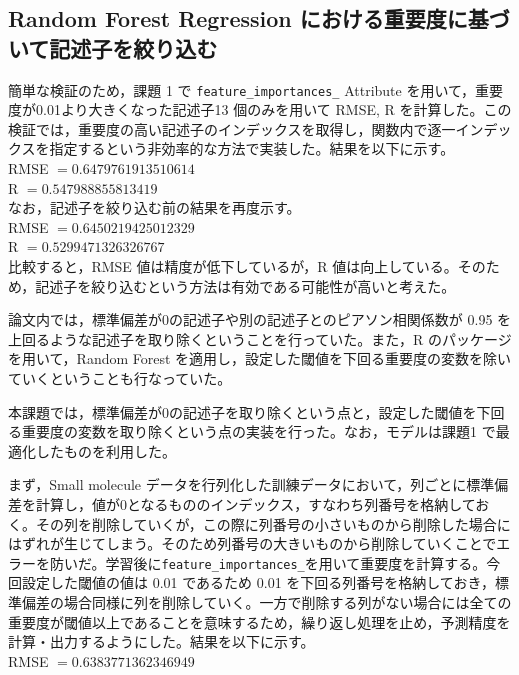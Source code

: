\documentclass[a4j,11pt]{jarticle}
\begin{document}
\subsection{ Random Forest Regression における重要度に基づいて記述子を絞り込む}
簡単な検証のため，課題 1 で \texttt{feature\_importances\_} Attribute を用いて，重要度が0.01より大きくなった記述子13 個のみを用いて RMSE, R を計算した。この検証では，重要度の高い記述子のインデックスを取得し，関数内で逐一インデックスを指定するという非効率的な方法で実装した。結果を以下に示す。\\
\linebreak
RMSE $= 0.6479761913510614$\\
R $= 0.547988855813419$ \\
\linebreak
なお，記述子を絞り込む前の結果を再度示す。\\
\linebreak
RMSE $= 0.6450219425012329$\\
R $= 0.5299471326326767$ \\
\linebreak
比較すると，RMSE 値は精度が低下しているが，R 値は向上している。そのため，記述子を絞り込むという方法は有効である可能性が高いと考えた。\par
論文内では，標準偏差が0の記述子や別の記述子とのピアソン相関係数が 0.95 を上回るような記述子を取り除くということを行っていた。また，R のパッケージを用いて，Random Forest を適用し，設定した閾値を下回る重要度の変数を除いていくということも行なっていた。\par
本課題では，標準偏差が0の記述子を取り除くという点と，設定した閾値を下回る重要度の変数を取り除くという点の実装を行った。なお，モデルは課題1 で最適化したものを利用した。\par
まず，Small molecule データを行列化した訓練データにおいて，列ごとに標準偏差を計算し，値が0となるもののインデックス，すなわち列番号を格納しておく。その列を削除していくが，この際に列番号の小さいものから削除した場合にはずれが生じてしまう。そのため列番号の大きいものから削除していくことでエラーを防いだ。学習後に\texttt{feature\_importances\_}を用いて重要度を計算する。今回設定した閾値の値は 0.01 であるため 0.01 を下回る列番号を格納しておき，標準偏差の場合同様に列を削除していく。一方で削除する列がない場合には全ての重要度が閾値以上であることを意味するため，繰り返し処理を止め，予測精度を計算・出力するようにした。結果を以下に示す。\\
\linebreak
RMSE $= 0.6383771362346949$\\
\end{document}
